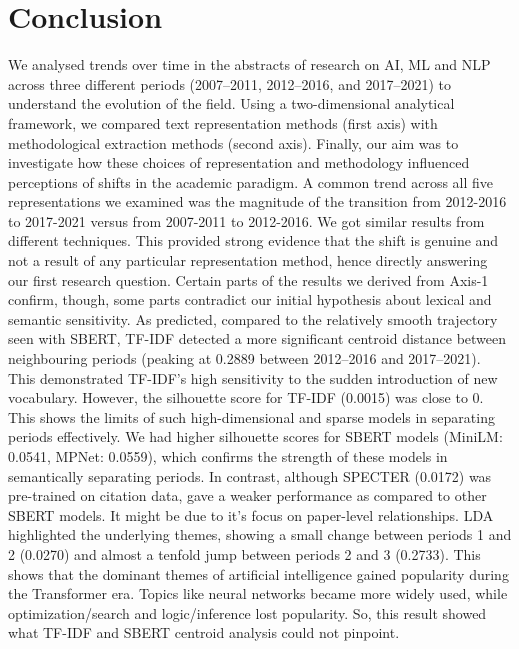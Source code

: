 \documentclass[11pt]{article}
\begin{document}
\section{Conclusion}
We analysed trends over time in the abstracts of research on AI, ML and NLP across three different periods (2007–2011, 2012–2016, and 2017–2021) to understand the evolution of the field. Using a two-dimensional analytical framework, we compared text representation methods (first axis) with methodological extraction methods (second axis). Finally, our aim was to investigate how these choices of representation and methodology influenced perceptions of shifts in the academic paradigm.
A common trend across all five representations we examined was the magnitude of the transition from 2012-2016 to 2017-2021 versus from 2007-2011 to 2012-2016. We got similar results from different techniques. This provided strong evidence that the shift is genuine and not a result of any particular representation method, hence directly answering our first research question.
Certain parts of the results we derived from Axis-1 confirm, though, some parts contradict our initial hypothesis about lexical and semantic sensitivity. As predicted, compared to the relatively smooth trajectory seen with SBERT, TF-IDF detected a more significant centroid distance between neighbouring periods (peaking at 0.2889 between 2012–2016 and 2017–2021). This demonstrated TF-IDF's high sensitivity to the sudden introduction of new vocabulary. However, the silhouette score for TF-IDF (0.0015) was close to 0. This shows the limits of such high-dimensional and sparse models in separating periods effectively. We had higher silhouette scores for SBERT models (MiniLM: 0.0541, MPNet: 0.0559), which confirms the strength of these models in semantically separating periods. In contrast, although SPECTER (0.0172) was pre-trained on citation data, gave a weaker performance as compared to other SBERT models. It might be due to it's focus on paper-level relationships. LDA highlighted the underlying themes, showing
a small change between periods 1 and 2 (0.0270) and almost a tenfold jump between periods 2 and 3 (0.2733). This shows that the dominant themes of artificial intelligence gained popularity during the Transformer era. Topics like neural networks became more widely used, while optimization/search and logic/inference lost popularity. So, this result showed what TF-IDF and SBERT centroid analysis could not pinpoint.
\end{document}

